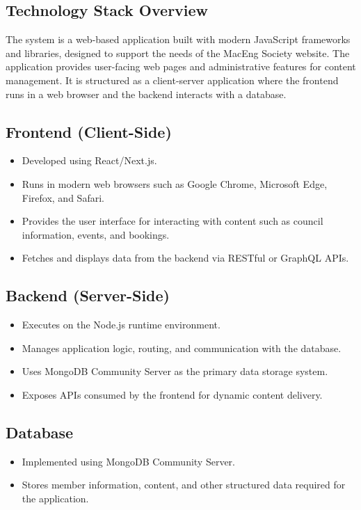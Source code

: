 \documentclass[12pt]{article}
\begin{document}
  \subsection{Technology Stack Overview}
    The system is a web-based application built with modern JavaScript frameworks and libraries, designed to support the needs of the MacEng Society website. The application provides user-facing web pages and administrative features for content management. It is structured as a client-server application where the frontend runs in a web browser and the backend interacts with a database.
    \subsection{Frontend (Client-Side)}
    \begin{itemize}
        \item Developed using React/Next.js.
        \item Runs in modern web browsers such as Google Chrome, Microsoft Edge, Firefox, and Safari.
        \item Provides the user interface for interacting with content such as council information, events, and bookings.
        \item Fetches and displays data from the backend via RESTful or GraphQL APIs.
    \end{itemize}

    \subsection{Backend (Server-Side)}
    \begin{itemize}
        \item Executes on the Node.js runtime environment.
        \item Manages application logic, routing, and communication with the database.
        \item Uses MongoDB Community Server as the primary data storage system.
        \item Exposes APIs consumed by the frontend for dynamic content delivery.
    \end{itemize}

    \subsection{Database}
    \begin{itemize}
        \item Implemented using MongoDB Community Server.
        \item Stores member information, content, and other structured data required for the application.
    \end{itemize}
\end{document}
